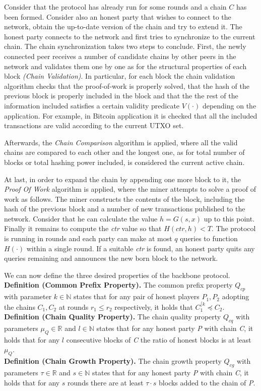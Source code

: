 \documentclass[10pt,a4paper]{article}
\begin{document}
Consider that the protocol has already run for some rounds and a chain $C$ has been formed. Consider
also an honest party that wishes to connect to the network, obtain the up-to-date version of the
chain and try to extend it.
The honest party connects to the network and first tries to synchronize to the current chain. The
chain synchronization takes two steps to conclude. First, the newly connected peer receives a number
of candidate chains by other peers in the network and validates them one by one as for the structural 
properties of each block \textit{(Chain Validation)}. In particular, for each block the chain
validation algorithm checks that the proof-of-work is properly solved, that the hash of the previous
block is properly included in the block and that the the rest of the information included satisfies
a certain validity predicate $V(\cdot)$ depending on the application. For example, in Bitcoin
application it is checked that all the included transactions are valid according to the current
UTXO set.

Afterwards, the \textit{Chain Comparison} algorithm is applied, where all the valid chains are
compared to each other and the longest one, as for total number of blocks or total hashing power
included, is considered the current active chain.

At last, in order to expand the chain by appending one more block to it, the \textit{Proof Of Work}
algorithm is applied, where the miner attempts to solve a proof of work as follows. The miner
constructs the contents of the block, including the hash of the previous block and a number of new
transactions published to the network. Consider that he can calculate the value $h = G(s,x)$ up
to this point. Finally it remains to compute the \textit{ctr} value so that $H(ctr, h) < T$. The
protocol is running in rounds and each party can make at most $q$ queries to function $H(\cdot)$
within a single round. If a suitable \textit{ctr} is found, an honest party quits any queries
remaining and announces the new born block to the network.

We can now define the three desired properties of the backbone protocol.\\
\textbf{Definition (Common Prefix Property).} The common prefix property $Q_{cp}$ with parameter
$k \in \mathbb{N}$ states that for any pair of honest players $P_1, P_2$ adopting the chains
$C_1, C_2$ at rounds $r_1 \leq r_2$ respectively, it holds that $C_1^{\lceil k} \preceq C_2$.\\
\textbf{Definition (Chain Quality Property).} The chain quality property $Q_{cq}$ with
parameters $\mu_Q \in \mathbb{R}$ and $l \in \mathbb{N}$ states that for any honest
party \textit{P} with chain \textit{C}, it holds that for any $l$ consecutive
blocks of \textit{C} the ratio of honest blocks is at least $\mu_Q$.\\
\textbf{Definition (Chain Growth Property).} The chain growth property $Q_{cg}$ with
parameters $\tau \in \mathbb{R}$ and $s \in \mathbb{N}$ states that for any honest party
\textit{P} with chain \textit{C}, it holds that for any $s$ rounds there are at least $\tau \cdot s$ blocks added to the chain of \textit{P}.
\end{document}
